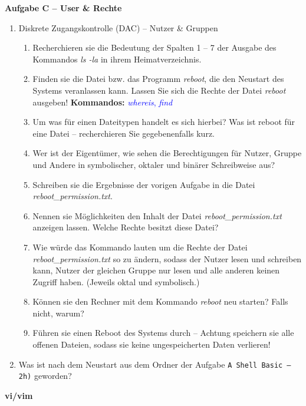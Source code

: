\documentclass[paper=a4,fontsize=11pt]{scrartcl}%
\numberwithin{equation}{section}
\begin{document}
\begin{center}\Large{\textbf{Aufgabe C -- User \& Rechte}}\end{center}\vskip0.25in
\begin{enumerate}
\item Diskrete Zugangskontrolle (DAC) -- Nutzer \& Gruppen
	\begin{enumerate}[label=(\alph*)]
        \item Recherchieren sie die Bedeutung der Spalten 1 -- 7 der Ausgabe des Kommandos \emph{ls -la} in ihrem Heimatverzeichnis.
        \item Finden sie die Datei bzw. das Programm \textit{reboot}, die den Neustart des Systems veranlassen kann. Lassen Sie sich die Rechte der Datei \textit{reboot} ausgeben!
        \textbf{Kommandos:} \textcolor{blue}{\emph{whereis}, \emph{find}}
        \item Um was für einen Dateitypen handelt es sich hierbei? Was ist reboot für eine Datei -- recherchieren Sie gegebenenfalls kurz.
        \item Wer ist der Eigentümer, wie sehen die Berechtigungen für Nutzer, Gruppe und Andere in symbolischer, oktaler und binärer Schreibweise aus?
        \item Schreiben sie die Ergebnisse der vorigen Aufgabe in die Datei \textit{reboot\-\_permission.txt}.
        \item Nennen sie Möglichkeiten den Inhalt der Datei \textit{reboot\-\_permission.txt} anzeigen lassen. Welche Rechte besitzt diese Datei?
        \item Wie würde das Kommando lauten um die Rechte der Datei \textit{reboot\-\_permission.txt} so zu ändern, sodass der Nutzer lesen und schreiben kann, Nutzer der gleichen Gruppe nur lesen und alle anderen keinen Zugriff haben. (Jeweils oktal und symbolisch.) 
        \item Können sie den Rechner mit dem Kommando \textit{reboot} neu starten? Falls nicht, warum?
        \item Führen sie einen Reboot des Systems durch -- Achtung speichern sie alle offenen Dateien, sodass sie keine ungespeicherten Daten verlieren!
  \end{enumerate}
  \item Was ist nach dem Neustart aus dem Ordner der Aufgabe \texttt{A Shell Basic -- 2h)} geworden?
\end{enumerate}
\begin{center}\Large{\textbf{vi/vim}}\end{center}\vskip0.25in
\end{document}
